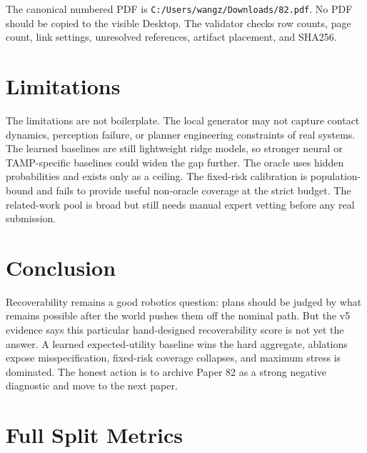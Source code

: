 \documentclass{article}
\begin{document}
The canonical numbered PDF is \texttt{C:/Users/wangz/Downloads/82.pdf}. No PDF should be copied to the visible Desktop. The validator checks row counts, page count, link settings, unresolved references, artifact placement, and SHA256.

\section{Limitations}

The limitations are not boilerplate. The local generator may not capture contact dynamics, perception failure, or planner engineering constraints of real systems. The learned baselines are still lightweight ridge models, so stronger neural or TAMP-specific baselines could widen the gap further. The oracle uses hidden probabilities and exists only as a ceiling. The fixed-risk calibration is population-bound and fails to provide useful non-oracle coverage at the strict budget. The related-work pool is broad but still needs manual expert vetting before any real submission.

\section{Conclusion}

Recoverability remains a good robotics question: plans should be judged by what remains possible after the world pushes them off the nominal path. But the v5 evidence says this particular hand-designed recoverability score is not yet the answer. A learned expected-utility baseline wins the hard aggregate, ablations expose misspecification, fixed-risk coverage collapses, and maximum stress is dominated. The honest action is to archive Paper 82 as a strong negative diagnostic and move to the next paper.

\appendix

\section{Full Split Metrics}
\end{document}
